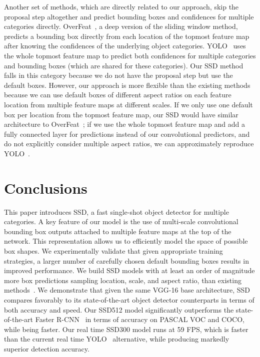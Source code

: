 \documentclass[runningheads]{llncs}
\begin{document}
Another set of methods, which are directly related to our approach, skip the proposal step altogether and predict bounding boxes and confidences for multiple categories directly. OverFeat~\cite{sermanet2013overfeat}, a deep version of the sliding window method, predicts a bounding box directly from each location of the topmost feature map after knowing the confidences of the underlying object categories. YOLO~\cite{redmon2015you} uses the whole topmost feature map to predict both confidences for multiple categories and bounding boxes (which are shared for these categories). Our SSD method falls in this category because we do not have the proposal step but use the default boxes. However, our approach is more flexible than the existing methods because we can use default boxes of different aspect ratios on each feature location from multiple feature maps at different scales. If we only use one default box per location from the topmost feature map, our SSD would have similar architecture to OverFeat~\cite{sermanet2013overfeat}; if we use the whole topmost feature map and add a fully connected layer for predictions instead of our convolutional predictors, and do not explicitly consider multiple aspect ratios, we can approximately reproduce YOLO~\cite{redmon2015you}.

\section{Conclusions}
\label{sec:futurework}
This paper introduces SSD, a fast single-shot object detector for multiple categories. A key feature of our model is the use of multi-scale convolutional bounding box outputs attached to multiple feature maps at the top of the network. This representation allows us to efficiently model the space of possible box shapes. We experimentally validate that given appropriate training strategies, a larger number of carefully chosen default bounding boxes results in improved performance. We build SSD models with at least an order of magnitude more box predictions sampling location, scale, and aspect ratio, than existing methods~\cite{redmon2015you,erhan2014scalable}. We demonstrate that given the same VGG-16 base architecture, SSD compares favorably to its state-of-the-art object detector counterparts in terms of both accuracy and speed.  Our SSD512 model significantly outperforms the state-of-the-art Faster R-CNN~\cite{ren2015faster} in terms of accuracy on PASCAL VOC and COCO, while being  faster. Our real time SSD300 model runs at 59 FPS, which is faster than the current real time YOLO~\cite{redmon2015you} alternative, while producing markedly superior detection accuracy.
\end{document}
